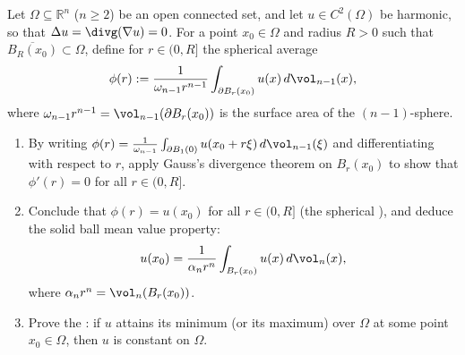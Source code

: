 \begin{exercise}
\label{ex:harmonic_mean_value_maximum_principle}
Let $\Omega \subseteq \mathbb{R}^n$ ($n \geq 2$) be an open connected set, and let $u \in C^2(\Omega)$
be harmonic, so that $\Delta u = \divg(\nabla u) = 0$.
For a point $x_0 \in \Omega$ and radius $R > 0$ such that $\overline{B_R(x_0)} \subset \Omega$, define
for $r \in (0, R]$ the spherical average
\[
\phi(r) := \frac{1}{\omega_{n-1} r^{n-1}} \int_{\partial B_r(x_0)} u(x) \, d\vol_{n-1}(x),
\]
where $\omega_{n-1} r^{n-1} = \vol_{n-1}(\partial B_r(x_0))$ is the surface area of the $(n{-}1)$-sphere.
\begin{enumerate}[label=\textbf{(\alph*)}]
  \item By writing $\phi(r) = \frac{1}{\omega_{n-1}} \int_{\partial B_1(0)} u(x_0 + r\xi) \, d\vol_{n-1}(\xi)$
    and differentiating with respect to $r$, apply Gauss's divergence theorem on $B_r(x_0)$ to show that
    $\phi'(r) = 0$ for all $r \in (0, R]$.
  \item Conclude that $\phi(r) = u(x_0)$ for all $r \in (0, R]$ (the spherical ),
    and deduce the solid ball mean value property:
    \[
    u(x_0) = \frac{1}{\alpha_n r^n} \int_{B_r(x_0)} u(x) \, d\vol_n(x),
    \]
    where $\alpha_n r^n = \vol_n(B_r(x_0))$.
  \item Prove the : if $u$ attains its minimum (or its maximum)
    over $\Omega$ at some point $x_0 \in \Omega$, then $u$ is constant on $\Omega$.
\end{enumerate}
\end{exercise}


